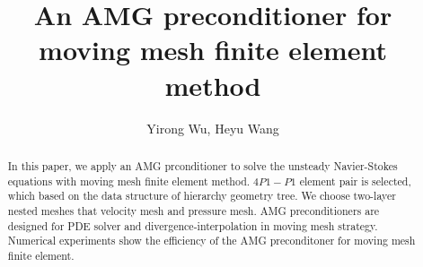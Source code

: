 \documentclass{eajam}
\begin{document}

\title{An AMG preconditioner for moving mesh finite element method}


%
\author[Yirong Wu and Heyu Wang]{Yirong Wu, Heyu Wang\corrauth}
\address{School of Mathematical Science, ZheJiang University, HangZhou,
  310027, China}
%
%


\begin{abstract}
    In this paper, we apply an AMG prconditioner to solve
    the unsteady Navier-Stokes equations with moving mesh finite
    element method. $4P1-P1$ element pair is selected, which based on
    the data structure of hierarchy geometry tree. We choose two-layer nested
    meshes that velocity mesh and pressure mesh. AMG preconditioners
    are designed for PDE solver and divergence-interpolation in moving
    mesh strategy. Numerical experiments show the efficiency of the
    AMG preconditoner for moving mesh finite element. \\
\end{abstract}



\maketitle
\end{document}
